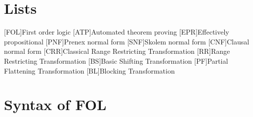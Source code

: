 \appendix
\renewcommand{\appendixtocname}{Appendix}
\renewcommand{\appendixpagename}{\appendixtocname}
\renewcommand{\lstlistlistingname}{List of Examples}
\addappheadtotoc
{}
%
\appendixpage

\chapter{Lists}


\begin{acronym}[\hspace{3cm}]
  [FOL]{First order logic}
  [ATP]{Automated theorem proving}
  [EPR]{Effectively propositional}
  [PNF]{Prenex normal form}
  [SNF]{Skolem normal form}
  [CNF]{Clausal normal form}
  [CRR]{Classical Range Restricting Transformation}
  [RR]{Range Restricting Transformation}
  [BS]{Basic Shifting Transformation}
  [PF]{Partial Flattening Transformation}
  [BL]{Blocking Transformation}
\end{acronym}
\clearpage


\listoffigures
{}

\listoftables
{}

\lstlistoflistings
{}

\listofalgorithms
{}


\chapter{Syntax of FOL}\label{chap:appendix_fol}
